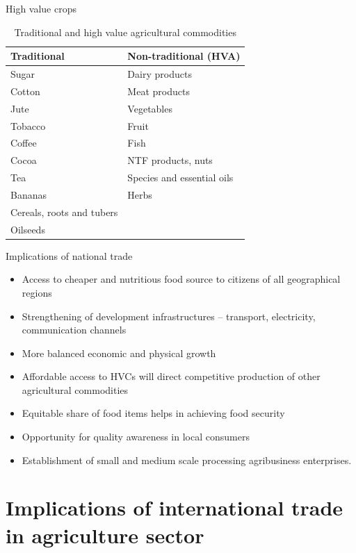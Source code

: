\documentclass[12pt,ignorenonframetext,aspectratio=169]{beamer}
\providecommand{\tightlist}{%
  \setlength{\itemsep}{0pt}\setlength{\parskip}{0pt}}
\begin{document}
\begin{frame}{High value crops}
\protect\hypertarget{high-value-crops}{}
\begin{table}

\caption{\label{tab:high-value-crops}Traditional and high value agricultural commodities}
\centering
\fontsize{8}{10}\selectfont
\begin{tabular}[t]{ll}
\toprule
Traditional & Non-traditional (HVA)\\
\midrule
Sugar & Dairy products\\
Cotton & Meat products\\
Jute & Vegetables\\
Tobacco & Fruit\\
Coffee & Fish\\
\addlinespace
Cocoa & NTF products, nuts\\
Tea & Species and essential oils\\
Bananas & Herbs\\
Cereals, roots and tubers & \\
Oilseeds & \\
\bottomrule
\end{tabular}
\end{table}
\end{frame}

\begin{frame}{Implications of national trade}
\protect\hypertarget{implications-of-national-trade}{}
\begin{itemize}
\tightlist
\item
  Access to cheaper and nutritious food source to citizens of all
  geographical regions
\item
  Strengthening of development infrastructures -- transport,
  electricity, communication channels
\item
  More balanced economic and physical growth
\item
  Affordable access to HVCs will direct competitive production of other
  agricultural commodities
\item
  Equitable share of food items helps in achieving food security
\item
  Opportunity for quality awareness in local consumers
\item
  Establishment of small and medium scale processing agribusiness
  enterprises.
\end{itemize}
\end{frame}

\hypertarget{implications-of-international-trade-in-agriculture-sector}{%
\section{Implications of international trade in agriculture
sector}\label{implications-of-international-trade-in-agriculture-sector}}
\end{document}
